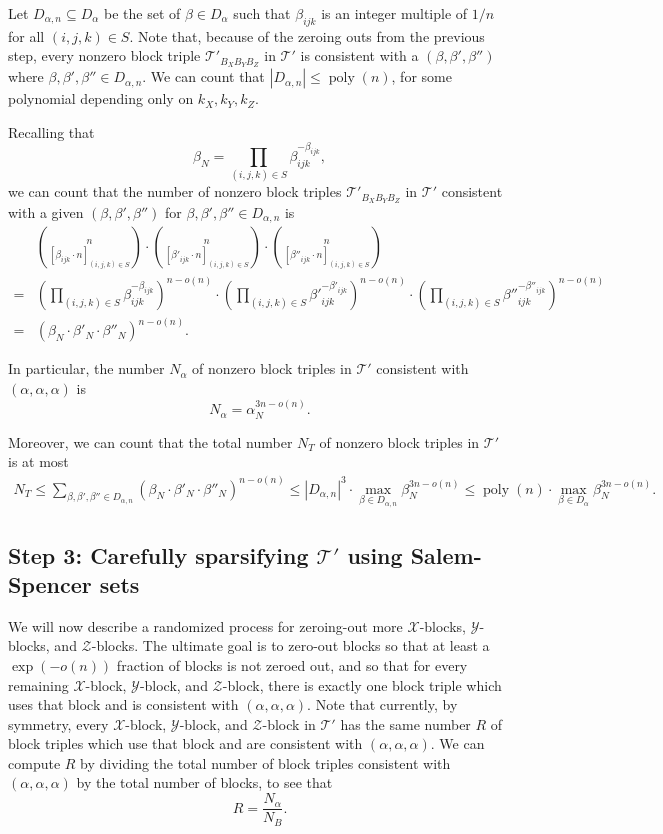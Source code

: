 \documentclass{theoretics}
\newcommand{\poly}{\mathop{\mathrm{poly}}}
\newcommand{\T}{\mathcal{T}}
\newcommand{\X}{\mathcal{X}}
\newcommand{\Y}{\mathcal{Y}}
\newcommand{\Z}{\mathcal{Z}}
\begin{document}
Let $D_{\alpha,n} \subseteq D_\alpha$ be the set of $\beta \in D_\alpha$ such that $\beta_{ijk}$ is an integer multiple of $1/n$ for all $(i,j,k) \in S$.
Note that, because of the zeroing outs from the previous step, every nonzero block triple $\T'_{B_X B_Y B_Z}$ in $\T'$ is consistent with a $(\beta,\beta',\beta'')$ where $\beta,\beta',\beta'' \in D_{\alpha,n}$.
We can count that $|D_{\alpha,n}| \leq \poly(n)$, for some polynomial depending only on $k_X, k_Y, k_Z$.

Recalling that $$\beta_N = \prod_{(i,j,k) \in S} \beta_{ijk}^{-\beta_{ijk}},$$ we can count that the number of nonzero block triples $\T'_{B_X B_Y B_Z}$ in $\T'$ consistent with a given $(\beta,\beta',\beta'')$ for $\beta,\beta',\beta'' \in D_{\alpha,n}$ is  \begin{align*}&\binom{n}{[\beta_{ijk} \cdot n]_{(i,j,k) \in S}} \cdot \binom{n}{[{\beta'}_{ijk} \cdot n]_{(i,j,k) \in S}} \cdot \binom{n}{[{\beta''}_{ijk} \cdot n]_{(i,j,k) \in S}} \\ = & \left( \prod_{(i,j,k) \in S} \beta_{ijk}^{-\beta_{ijk}} \right)^{n-o(n)} \cdot \left( \prod_{(i,j,k) \in S} {\beta'}_{ijk}^{-{\beta'}_{ijk}} \right)^{n-o(n)} \cdot \left( \prod_{(i,j,k) \in S} {\beta''}_{ijk}^{-{\beta''}_{ijk}} \right)^{n-o(n)} \\ = &(\beta_N \cdot \beta'_N \cdot \beta''_N)^{n - o(n)}.\end{align*}

In particular, the number $N_\alpha$ of nonzero block triples in $\T'$ consistent with $(\alpha,\alpha,\alpha)$ is $$N_\alpha = \alpha_N^{3n - o(n)}.$$

Moreover, we can count that the total number $N_T$ of nonzero block triples in $\T'$ is at most
\begin{align*}
    N_T \leq \sum_{\beta, \beta', \beta'' \in D_{\alpha,n}} (\beta_N \cdot \beta'_N \cdot \beta''_N)^{n - o(n)} \leq |D_{\alpha,n}|^3 \cdot \max_{\beta \in D_{\alpha,n}} \beta_N^{3n - o(n)} \leq \poly(n) \cdot \max_{\beta \in D_{\alpha}} \beta_N^{3n - o(n)}.
\end{align*}

\subsection{Step 3: Carefully sparsifying \texorpdfstring{$\T'$}{T'} using Salem-Spencer sets}\label{subsec:step3}

We will now describe a randomized process for zeroing-out more $\X$-blocks, $\Y$-blocks, and $\Z$-blocks. The ultimate goal is to zero-out blocks so that at least a $\exp(-o(n))$ fraction of blocks is not zeroed out, and so that for every remaining $\X$-block, $\Y$-block, and $\Z$-block, there is exactly one block triple which uses that block and is consistent with $(\alpha,\alpha,\alpha)$. Note that currently, by symmetry, every  $\X$-block, $\Y$-block, and $\Z$-block in $\T'$ has the same number $R$ of block triples which use that block and are consistent with $(\alpha,\alpha,\alpha)$. We can compute $R$ by dividing the total number of block triples consistent with $(\alpha,\alpha,\alpha)$ by the total number of blocks, to see that $$R = \frac{N_\alpha}{N_B}.$$
\end{document}
